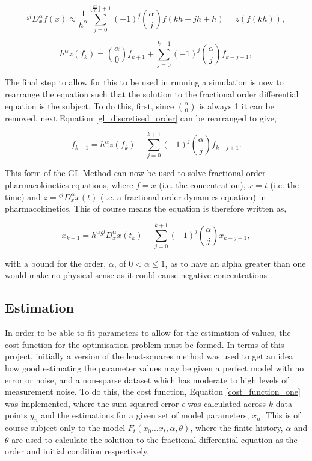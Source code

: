 \begin{equation}\label{gl_semi_ddiscretised_order}
	^{gl}D^{\alpha}_{x}f(x) \approx \frac{1}{h^{\alpha}}\sum_{j=0}^{\lfloor\frac{kh}{h}\rfloor+1} (-1)^{j} {\alpha \choose j} f(kh - jh + h) = z(f(kh)),
\end{equation}

\begin{equation}\label{gl_discretised_order}
	 h^{\alpha}z(f_{k}) = {\alpha \choose 0} f_{k+1} + \sum_{j=0}^{k+1} (-1)^{j} {\alpha \choose j} f_{k - j + 1},
\end{equation}

The final step to allow for this to be used in running a simulation is now to rearrange the equation such that the solution to the fractional order differential equation is the subject. To do this, first, since ${\alpha \choose 0}$ is always 1 it can be removed, next Equation \ref{gl_discretised_order} can be rearranged to give,

\begin{equation}\label{gl_solution}
	f_{k+1} = h^{\alpha}z(f_{k}) - \sum_{j=0}^{k+1} (-1)^{j} {\alpha \choose j} f_{k - j + 1}.
\end{equation}

This form of the GL Method can now be used to solve fractional order pharmacokinetics equations, where $f = x$ (i.e. the concentration), $x = t$ (i.e. the time) and $z = \phantom{}^{gl}D^{\alpha}_{x}x(t)$ (i.e. a fractional order dynamics equation) in pharmacokinetics. This of course means the equation is therefore written as,

\begin{equation}\label{gl_pk_solution}
	x_{k+1} = h^{\alpha}\phantom{ }^{gl}D^{\alpha}_{x}x(t_k) - \sum_{j=0}^{k+1} (-1)^{j} {\alpha \choose j} x_{k - j + 1},
\end{equation}

with a bound for the order, $\alpha$, of $0 < \alpha \leq 1$, as to have an alpha greater than one would make no physical sense as it could cause negative concentrations \cite{Fractional_calculus_in_pharmacokinetics}.

\subsection{Estimation}

In order to be able to fit parameters to allow for the estimation of values, the cost function for the optimisation problem must be formed. In terms of this project, initially a version of the least-squares method was used to get an idea how good estimating the parameter values may be given a perfect model with no error or noise, and a non-sparse dataset which has moderate to high levels of measurement noise. To do this, the cost function, Equation \ref{cost_function_one} was implemented, where the sum squared error $\epsilon$ was calculated across $k$ data points $y_{n}$ and the estimations for a given set of model parameters, $x_{n}$. This is of course subject only to the model $F_{t}(x_{0} \dots x_{t}, \alpha, \theta)$, where the finite history, $\alpha$ and $\theta$ are used to calculate the solution to the fractional differential equation as the order and initial condition respectively.

